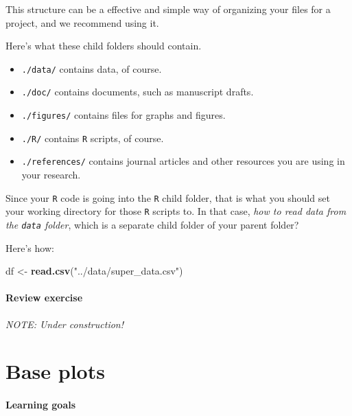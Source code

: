 \documentclass[
]{book}
\newenvironment{Shaded}{\begin{snugshade}}{\end{snugshade}}
\newcommand{\KeywordTok}[1]{\textcolor[rgb]{0.13,0.29,0.53}{\textbf{#1}}}
\newcommand{\NormalTok}[1]{#1}
\newcommand{\StringTok}[1]{\textcolor[rgb]{0.31,0.60,0.02}{#1}}
\providecommand{\tightlist}{%
  \setlength{\itemsep}{0pt}\setlength{\parskip}{0pt}}
\begin{document}
This structure can be a effective and simple way of organizing your files for a project, and we recommend using it.

Here's what these child folders should contain.

\begin{itemize}
\tightlist
\item
  \texttt{./data/} contains data, of course.
\item
  \texttt{./doc/} contains documents, such as manuscript drafts.
\item
  \texttt{./figures/} contains files for graphs and figures.
\item
  \texttt{./R/} contains \texttt{R} scripts, of course.
\item
  \texttt{./references/} contains journal articles and other resources you are using in your research.
\end{itemize}

Since your \texttt{R} code is going into the \texttt{R} child folder, that is what you should set your working directory for those \texttt{R} scripts to. In that case, \emph{how to read data from the \texttt{data} folder}, which is a separate child folder of your parent folder?

Here's how:

\begin{Shaded}
\begin{Highlighting}[]
\NormalTok{df <-}\StringTok{ }\KeywordTok{read.csv}\NormalTok{(}\StringTok{"../data/super_data.csv"}\NormalTok{)}
\end{Highlighting}
\end{Shaded}

\hypertarget{review-exercise}{%
\subsubsection*{Review exercise}\label{review-exercise}}

\emph{NOTE: Under construction!}

\hypertarget{base-plots}{%
\chapter{Base plots}\label{base-plots}}

\hypertarget{learning-goals-8}{%
\subsubsection*{Learning goals}\label{learning-goals-8}}
\end{document}
